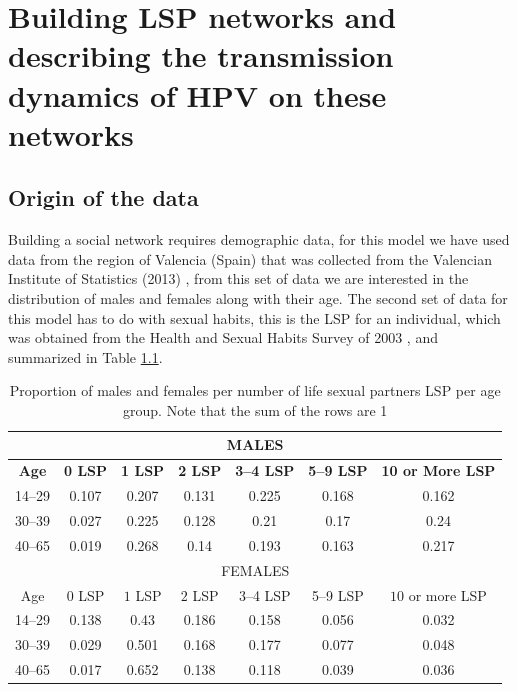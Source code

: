 \chapter{Building LSP networks and describing the transmission dynamics of HPV on these networks}\label{ConstruccionYDinamica}

\section{Origin of the data}

Building a social network requires demographic data, for this model we have used data from the region of Valencia (Spain) that was collected from the Valencian Institute of Statistics (2013) \cite{IVE}, from this set of data we are interested in the distribution of males and females along with their age. The second set of data for this model has to do with sexual habits, this is the LSP for an individual, which was obtained from the Health and Sexual Habits Survey of 2003 \cite{INE}, and summarized in Table \ref{tableLSPValues}. 

\begin{table}[H]
\centering
\begin{tabular}{ccccccc}
\toprule
\multicolumn{7}{c}{\textbf{MALES}} \\ \midrule
\textbf{ Age} & \textbf{0 LSP} & \textbf{1 LSP} &\textbf{ 2 LSP} & \textbf{3--4 LSP} & \textbf{5--9 LSP} & \textbf{10 or More LSP} \\
\midrule
14--29 & 0.107 & 0.207 & 0.131 & 0.225 & 0.168 & 0.162 \\
30--39 & 0.027 & 0.225 & 0.128 & 0.21 & 0.17 & 0.24 \\
40--65 & 0.019 & 0.268 & 0.14 & 0.193 & 0.163 & 0.217 \\
 \midrule 
 
\multicolumn{7}{c}{FEMALES} \\ \midrule
  Age & $0$ LSP & $1$ LSP & $2$ LSP & 3--4 LSP & 5--9 LSP & $10$ or more LSP \\
 \midrule
14--29 & 0.138 & 0.43 & 0.186 & 0.158 & 0.056 & 0.032 \\
30--39 & 0.029 & 0.501 & 0.168 & 0.177 & 0.077 & 0.048 \\
40--65 & 0.017 & 0.652 & 0.138 & 0.118 & 0.039 & 0.036 \\
\bottomrule
\end{tabular} 
\caption{Proportion of males and females per number of life sexual partners {LSP} per age group. Note that the sum of the rows are 1}
\label{tableLSPValues} 
\end{table}

